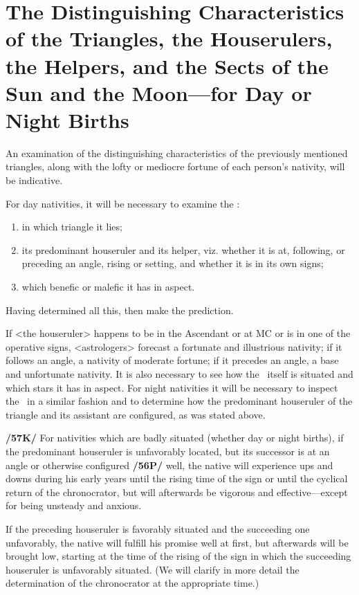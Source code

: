\section{The Distinguishing Characteristics of the Triangles, the Houserulers, the Helpers, and the Sects of the Sun and the Moon—for Day or Night Births}
An examination of the distinguishing characteristics of the previously mentioned triangles, along with the lofty or mediocre fortune of each person’s nativity, will be indicative. 

\mnm[0.3cm]
For day nativities, it will be necessary to examine the \Sun: 
\begin{enumerate}
\item in which triangle it lies;
\item its predominant houseruler and its helper, viz. whether it is at, following, or preceding an angle, rising or setting, and whether it is in its own signs;
\item which benefic or malefic it has in aspect. 
\end{enumerate}
Having determined all this, then make the prediction. 

\mndl[0.2cm]
If <the houseruler> happens to be in the Ascendant or at MC or is in one of the operative signs, <astrologers> forecast a fortunate and illustrious nativity; if it follows an angle, a nativity of moderate fortune; if it precedes an angle, a base and unfortunate nativity. It is also necessary to see how the \Sun\, itself is situated and which stars it has in aspect. For night nativities it will be necessary to inspect the \Moon\, in a similar fashion and to determine how the predominant houseruler of the triangle and its assistant are configured, as was stated above.

\textbf{/57K/}  For nativities which are badly situated (whether day or night births), if the predominant
houseruler is unfavorably located, but its successor is at an angle or otherwise configured \textbf{/56P/} well, the
native will experience ups and downs during his early years until the rising time of the sign or until the cyclical return of the chronocrator, but will afterwards be vigorous and effective—except for being unsteady and anxious. 

If the preceding houseruler is favorably situated and the succeeding one unfavorably, the native will fulfill his promise well at first, but afterwards will be brought low, starting at the time of the rising of the sign in which the succeeding houseruler is unfavorably situated. (We will clarify in more detail the determination of the chronocrator at the appropriate time.) 


